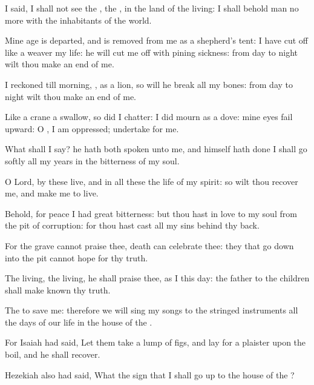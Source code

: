 {I
said, I shall not
see the
{},
{} the
{}, in the
land of the
living: I shall
behold
man no more with the
inhabitants of the
world.

Mine
age is
departed, and is
removed from me as a
shepherd’s
tent: I have cut
off like a
weaver my
life: he will cut me
off with pining
sickness: from
day
{} to
night wilt thou make an
end of me.

I
reckoned till
morning,
{}, as a
lion, so will he
break all my
bones: from
day
{} to
night wilt thou make an
end of me.

Like a
crane
{} a
swallow, so did I
chatter: I did
mourn as a
dove: mine
eyes
fail
{}
upward: O
{}, I am
oppressed;
undertake for me.

What shall I
say? he hath both
spoken unto me, and himself hath
done
{} I shall go
softly all my
years in the
bitterness of my
soul.

O
Lord, by these
{}
live, and in all these
{} the
life of my
spirit: so wilt thou
recover me, and make me to
live.

Behold, for
peace I had great
bitterness: but thou hast in
love to my
soul
{} from the
pit of
corruption: for thou hast
cast all my
sins
behind thy
back.

For the
grave cannot
praise thee,
death can
{}
celebrate thee: they that go
down into the
pit cannot
hope for thy
truth.

The
living, the
living, he shall
praise thee, as I
{} this
day: the
father to the
children shall make
known thy
truth.

The
{}
{} to
save me: therefore we will sing my
songs to the stringed
instruments all the
days of our
life in the
house of the
{}.

For
Isaiah had
said, Let them
take a
lump of
figs, and lay
{} for a
plaister upon the
boil, and he shall
recover.

Hezekiah also had
said, What
{} the
sign that I shall go
up to the
house of the
{}?




}
